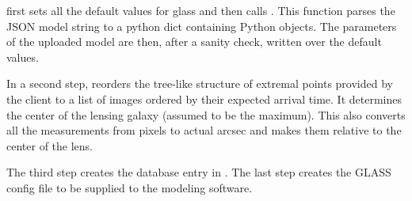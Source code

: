  first sets all the default values for glass and then calls .
This function parses the JSON model string to a python dict containing Python objects.
The parameters of the uploaded model are then, after a sanity check, written over the default values.

In a second step,  reorders the tree-like structure of extremal points provided by the client to a list of images ordered by their expected arrival time. It determines the center of the lensing galaxy (assumed to be the maximum). This also converts all the measurements from \spl pixels to actual arcsec and makes them relative to the center of the lens.

The third step  creates the database entry in .
The last step  creates the GLASS config file to be supplied to the modeling software.










